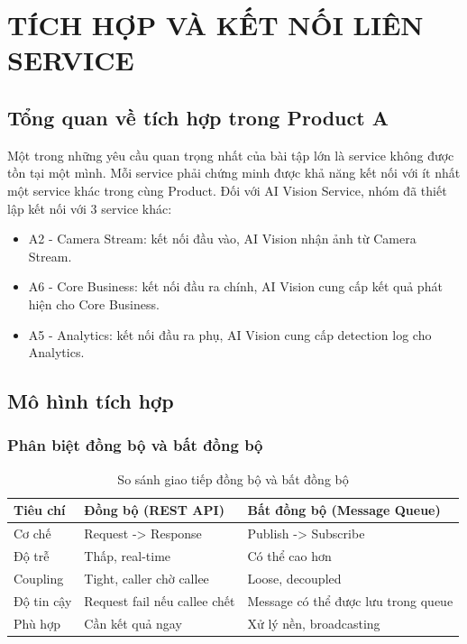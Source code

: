 \chapter{TÍCH HỢP VÀ KẾT NỐI LIÊN SERVICE}

\section{Tổng quan về tích hợp trong Product A}

Một trong những yêu cầu quan trọng nhất của bài tập lớn là service không được tồn tại một mình. Mỗi service phải chứng minh được khả năng kết nối với ít nhất một service khác trong cùng Product. Đối với AI Vision Service, nhóm đã thiết lập kết nối với 3 service khác:

\begin{itemize}
    \item A2 - Camera Stream: kết nối đầu vào, AI Vision nhận ảnh từ Camera Stream.
    \item A6 - Core Business: kết nối đầu ra chính, AI Vision cung cấp kết quả phát hiện cho Core Business.
    \item A5 - Analytics: kết nối đầu ra phụ, AI Vision cung cấp detection log cho Analytics.
\end{itemize}

\section{Mô hình tích hợp}

\subsection{Phân biệt đồng bộ và bất đồng bộ}

\begin{table}[H]
\centering
\caption{So sánh giao tiếp đồng bộ và bất đồng bộ}
\label{tab:sync-async}
\ReportTableFont
\begin{tabular}{|>{\raggedright\arraybackslash}p{3cm}|>{\raggedright\arraybackslash}p{5cm}|>{\raggedright\arraybackslash}p{5cm}|}
\hline
\textbf{Tiêu chí} & \textbf{Đồng bộ (REST API)} & \textbf{Bất đồng bộ (Message Queue)} \\
\hline
Cơ chế & Request -> Response & Publish -> Subscribe \\
\hline
Độ trễ & Thấp, real-time & Có thể cao hơn \\
\hline
Coupling & Tight, caller chờ callee & Loose, decoupled \\
\hline
Độ tin cậy & Request fail nếu callee chết & Message có thể được lưu trong queue \\
\hline
Phù hợp & Cần kết quả ngay & Xử lý nền, broadcasting \\
\hline
\end{tabular}
\normalsize
{}
\end{table}

